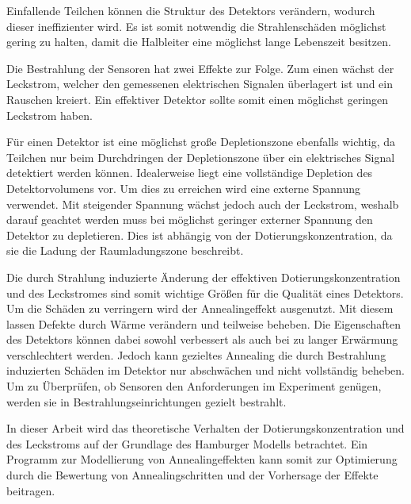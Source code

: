 Einfallende Teilchen können die
Struktur des Detektors verändern, wodurch dieser ineffizienter wird.
Es ist somit notwendig die Strahlenschäden möglichst gering zu halten, damit
die Halbleiter eine möglichst lange Lebenszeit besitzen.


Die Bestrahlung der Sensoren hat zwei Effekte zur Folge. Zum einen wächst der Leckstrom, welcher den
gemessenen elektrischen Signalen überlagert ist und ein Rauschen kreiert. Ein
effektiver Detektor sollte somit einen möglichst geringen Leckstrom haben.

Für einen Detektor ist eine möglichst große Depletionszone ebenfalls wichtig,
da Teilchen nur beim Durchdringen der Depletionszone über ein elektrisches Signal detektiert
werden können.
Idealerweise
liegt eine vollständige Depletion des Detektorvolumens vor. Um dies zu erreichen wird
eine externe Spannung verwendet. Mit steigender Spannung wächst jedoch auch der Leckstrom, weshalb
darauf geachtet werden muss bei möglichst geringer externer Spannung den Detektor zu depletieren.
Dies ist abhängig von der Dotierungskonzentration, da sie die Ladung der
Raumladungszone beschreibt.

Die durch Strahlung induzierte Änderung der effektiven Dotierungskonzentration und des Leckstromes sind
somit wichtige Größen für die Qualität eines Detektors.
Um die Schäden zu verringern wird der Annealingeffekt ausgenutzt. Mit diesem lassen
Defekte durch Wärme verändern und teilweise beheben. Die Eigenschaften des Detektors können
dabei sowohl verbessert als auch bei zu langer Erwärmung verschlechtert werden.
Jedoch kann gezieltes Annealing die durch Bestrahlung induzierten Schäden im Detektor nur
abschwächen und nicht vollständig beheben.
Um zu Überprüfen, ob Sensoren den Anforderungen im Experiment genügen, werden sie in
Bestrahlungseinrichtungen gezielt bestrahlt.

In dieser Arbeit wird das
theoretische Verhalten der Dotierungskonzentration und des Leckstroms auf der Grundlage des Hamburger Modells betrachtet.
Ein Programm zur Modellierung von Annealingeffekten kann somit zur
Optimierung durch die Bewertung von Annealingschritten und der Vorhersage der Effekte beitragen.

